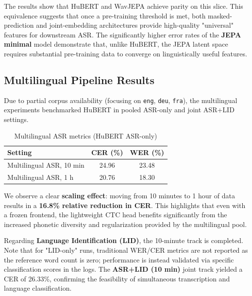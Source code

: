 \documentclass[11pt]{article}
\begin{document}
The results show that HuBERT and WavJEPA achieve parity on this slice. This equivalence suggests that once a pre-training threshold is met, both masked-prediction and joint-embedding architectures provide high-quality "universal" features for downstream ASR. The significantly higher error rates of the \textbf{JEPA minimal} model demonstrate that, unlike HuBERT, the JEPA latent space requires substantial pre-training data to converge on linguistically useful features.

\subsection*{Multilingual Pipeline Results}
Due to partial corpus availability (focusing on \texttt{eng}, \texttt{deu}, \texttt{fra}), the multilingual experiments benchmarked HuBERT in pooled ASR-only and joint ASR+LID settings.

\begin{table}[h]
    \centering
    \caption{Multilingual ASR metrics (HuBERT ASR-only)}
    \begin{tabular}{@{}lcc@{}}
        \toprule
        \textbf{Setting} & \textbf{CER (\%)} & \textbf{WER (\%)} \\ \midrule
        Multilingual ASR, 10 min & 24.96 & 23.48 \\
        Multilingual ASR, 1 h & 20.76 & 18.30 \\ \bottomrule
    \end{tabular}
\end{table}

We observe a clear \textbf{scaling effect}: moving from 10 minutes to 1 hour of data results in a \textbf{16.8\% relative reduction in CER}. This highlights that even with a frozen frontend, the lightweight CTC head benefits significantly from the increased phonetic diversity and regularization provided by the multilingual pool. 

Regarding \textbf{Language Identification (LID)}, the 10-minute track is completed. Note that for "LID-only" runs, traditional WER/CER metrics are not reported as the reference word count is zero; performance is instead validated via specific classification scores in the logs. The \textbf{ASR+LID (10 min)} joint track yielded a CER of 26.33\%, confirming the feasibility of simultaneous transcription and language classification.
\end{document}
